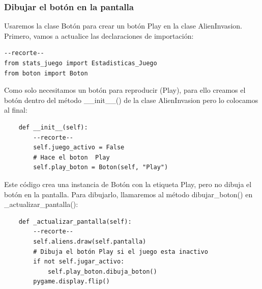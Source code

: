 \subsubsection{Dibujar el botón en la pantalla}

Usaremos la clase Botón para crear un botón Play en la clase {\ttfamily AlienInvasion}. Primero, vamos a
actualice las declaraciones de importación:


\hspace{-2.4cm}{\ttfamily \scriptsize invasión}

\vspace{-0.2cm}
\hspace{-2.1cm}{\ttfamily \scriptsize \_alien.py}\vspace{-0.84cm}
\begin{lstlisting}		
--recorte--
from stats_juego import Estadisticas_Juego
from boton import Boton
\end{lstlisting}


Como solo necesitamos un botón para reproducir  (Play),  para ello creamos el botón dentro del método {\ttfamily\_\_init\_\_()} de la clase  {\ttfamily AlienInvasion} pero lo colocamos al final:

\hspace{-2.4cm}{\ttfamily \scriptsize invasión}

\vspace{-0.2cm}
\hspace{-2.1cm}{\ttfamily \scriptsize \_alien.py}\vspace{-0.84cm}
\begin{lstlisting}	
    def __init__(self):
        --recorte--
        self.juego_activo = False
        # Hace el boton  Play 
        self.play_boton = Boton(self, "Play")
\end{lstlisting}


Este código crea una instancia de Botón con la etiqueta {\ttfamily Play}, pero no dibuja el botón en la pantalla.
Para dibujarlo, llamaremos al método {\ttfamily dibujar\_boton()}  en {\ttfamily \_actualizar\_pantalla()}:

\hspace{-2.4cm}{\ttfamily \scriptsize invasión}

\vspace{-0.2cm}
\hspace{-2.1cm}{\ttfamily \scriptsize \_alien.py}\vspace{-0.84cm}
\begin{lstlisting}		
    def _actualizar_pantalla(self):
        --recorte--
        self.aliens.draw(self.pantalla)
        # Dibuja el botón Play si el juego esta inactivo 
        if not self.jugar_activo:
            self.play_boton.dibuja_boton()
        pygame.display.flip()
\end{lstlisting}

